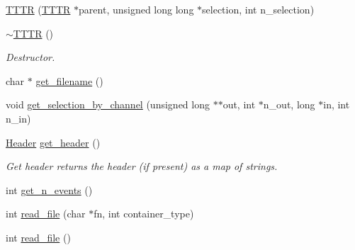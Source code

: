 \begin{DoxyCompactItemize}
\item 
\hyperlink{class_t_t_t_r_a0d329594e9c75d7c5091fa22e41f9cff}{T\+T\+TR} (\hyperlink{class_t_t_t_r}{T\+T\+TR} $\ast$parent, unsigned long long $\ast$selection, int n\+\_\+selection)
\item 
\hyperlink{class_t_t_t_r_ab5fdf04da2517b2cfbfcb279f9e9aee0}{$\sim$\+T\+T\+TR} ()
\begin{DoxyCompactList}\small\item\em Destructor. \end{DoxyCompactList}\item 
char $\ast$ \hyperlink{class_t_t_t_r_a3d856d880c72ad9772de2a774066cced}{get\+\_\+filename} ()
\item 
void \hyperlink{class_t_t_t_r_a9c96c502be774e60f4bcc3442c7a5011}{get\+\_\+selection\+\_\+by\+\_\+channel} (unsigned long $\ast$$\ast$out, int $\ast$n\+\_\+out, long $\ast$in, int n\+\_\+in)
\item 
\hyperlink{class_header}{Header} \hyperlink{class_t_t_t_r_a7953fb4f0b1d7ada40d6ff19cec45672}{get\+\_\+header} ()
\begin{DoxyCompactList}\small\item\em Get header returns the header (if present) as a map of strings. \end{DoxyCompactList}\item 
int \hyperlink{class_t_t_t_r_a00b74138ed8a061e30a615dfff328960}{get\+\_\+n\+\_\+events} ()
\item 
int \hyperlink{class_t_t_t_r_a499f299893269806ef42cca2227fd75b}{read\+\_\+file} (char $\ast$fn, int container\+\_\+type)
\item 
int \hyperlink{class_t_t_t_r_a4a8f9c4d510819de9ec7a7151c10a05e}{read\+\_\+file} ()
\end{DoxyCompactItemize}
